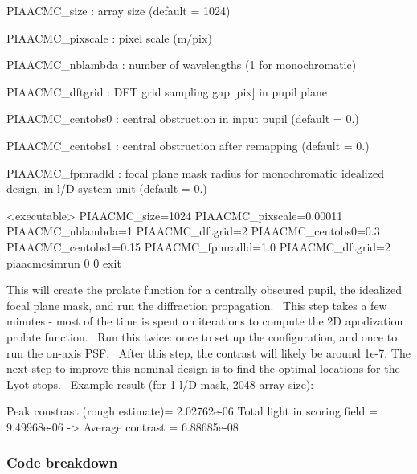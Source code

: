 \begin{DoxyItemize}
\item P\+I\+A\+A\+C\+M\+C\+\_\+size \+: array size (default = 1024)
\item P\+I\+A\+A\+C\+M\+C\+\_\+pixscale \+: pixel scale (m/pix)
\item P\+I\+A\+A\+C\+M\+C\+\_\+nblambda \+: number of wavelengths (1 for monochromatic)
\item P\+I\+A\+A\+C\+M\+C\+\_\+dftgrid \+: D\+F\+T grid sampling gap \mbox{[}pix\mbox{]} in pupil plane
\item P\+I\+A\+A\+C\+M\+C\+\_\+centobs0 \+: central obstruction in input pupil (default = 0.)
\item P\+I\+A\+A\+C\+M\+C\+\_\+centobs1 \+: central obstruction after remapping (default = 0.)
\item P\+I\+A\+A\+C\+M\+C\+\_\+fpmradld \+: focal plane mask radius for monochromatic idealized design, in l/\+D system unit (default = 0.)
\end{DoxyItemize}

\begin{DoxyVerb}<executable>
PIAACMC_size=1024
PIAACMC_pixscale=0.00011
PIAACMC_nblambda=1
PIAACMC_dftgrid=2
PIAACMC_centobs0=0.3
PIAACMC_centobs1=0.15
PIAACMC_fpmradld=1.0
PIAACMC_dftgrid=2
piaacmcsimrun 0 0
exit
\end{DoxyVerb}


This will create the prolate function for a centrally obscured pupil, the idealized focal plane mask, and run the diffraction propagation.~\newline
This step takes a few minutes -\/ most of the time is spent on iterations to compute the 2\+D apodization prolate function.~\newline
 Run this twice\+: once to set up the configuration, and once to run the on-\/axis P\+S\+F.~\newline
 After this step, the contrast will likely be around 1e-\/7. The next step to improve this nominal design is to find the optimal locations for the Lyot stops.~\newline
 Example result (for 1 l/\+D mask, 2048 array size)\+: \begin{DoxyVerb}Peak constrast (rough estimate)= 2.02762e-06
Total light in scoring field = 9.49968e-06  -> Average contrast = 6.88685e-08
\end{DoxyVerb}


\subsubsection*{Code breakdown}


